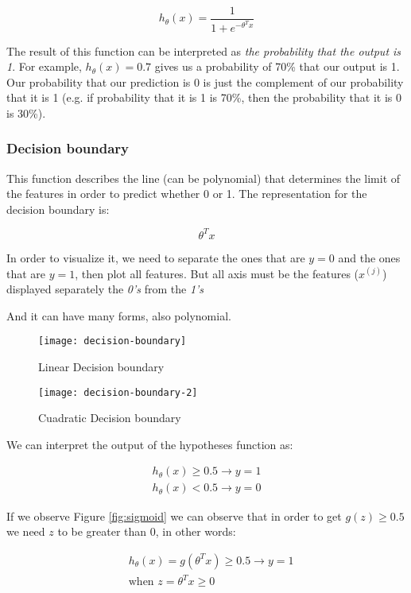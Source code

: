 $$h_{\theta}(x) = \frac{1}{1 + e^{-\theta^Tx}}$$

The result of this function can be interpreted as \textit{the probability that the output is 1}. For example, $h_{\theta}(x)=0.7$ gives us a probability of 70\% that our output is 1. Our probability that our prediction is 0 is just the complement of our probability that it is 1 (e.g. if probability that it is 1 is 70\%, then the probability that it is 0 is 30\%).


\subsubsection{Decision boundary}
This function describes the line (can be polynomial) that determines the limit of the features in order to predict whether 0 or 1. The representation for the decision boundary is:

$$\theta^Tx$$


\noindent In order to visualize it, we need to separate the ones that are $y = 0$ and the ones that are $y = 1$, then plot all features. But all axis must be the features ($x^{(j)}$) displayed separately the \textit{0's} from the \textit{1's}


\noindent And it can have many forms, also polynomial.


\begin{figure}[h]
	\begin{multicols}{2}
	\centering
	\texttt{[image: decision-boundary]}
	\caption{Linear Decision boundary}
	\label{fig:decision-boundary}

	\centering
	\texttt{[image: decision-boundary-2]}
	\caption{Cuadratic Decision boundary}
	\label{fig:decision-boundary-2}
	\end{multicols}
\end{figure}



\noindent We can interpret the output of the hypotheses function as:

\begin{align*}
	h_{\theta}(x) \ge 0.5 \to  y = 1 \\
	h_{\theta}(x) < 0.5 \to  y = 0
\end{align*}

\noindent If we observe Figure \ref{fig:sigmoid} we can observe that in order to get $g(z) \ge 0.5$ we need $z$ to be greater than $0$, in other words:

\begin{align*}
	& h_{\theta}(x) = g(\theta^Tx) \ge 0.5 \to  y = 1 \\
	& \text{when } z = \theta^Tx \ge 0
\end{align*}


